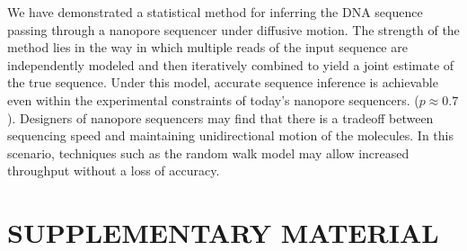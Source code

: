 \documentclass{biophys_letter}
\begin{document}




We have demonstrated a statistical method for inferring the DNA sequence passing through a nanopore sequencer under diffusive motion.
The strength of the method lies in the way in which multiple reads of the input sequence are independently modeled and then iteratively combined to yield a joint estimate of the true sequence.
Under this model, accurate sequence inference is achievable even within the experimental constraints of today's nanopore sequencers. ($p \approx 0.7$).
Designers of nanopore sequencers may find that there is a tradeoff between sequencing speed and maintaining unidirectional motion of the molecules.
In this scenario, techniques such as the random walk model may allow increased throughput without a loss of accuracy.

\section*{SUPPLEMENTARY MATERIAL}
\end{document}
